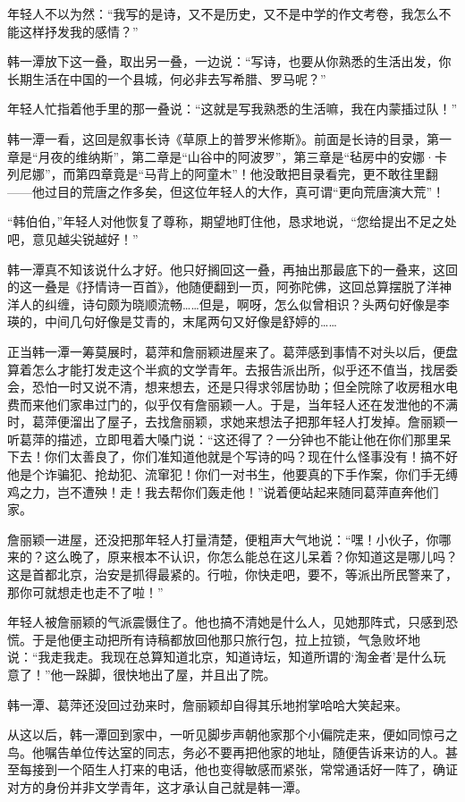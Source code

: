 \par 年轻人不以为然：“我写的是诗，又不是历史，又不是中学的作文考卷，我怎么不能这样抒发我的感情？”
\par 韩一潭放下这一叠，取出另一叠，一边说：“写诗，也要从你熟悉的生活出发，你长期生活在中国的一个县城，何必非去写希腊、罗马呢？”
\par 年轻人忙指着他手里的那一叠说：“这就是写我熟悉的生活嘛，我在内蒙插过队！”
\par 韩一潭一看，这回是叙事长诗《草原上的普罗米修斯》。前面是长诗的目录，第一章是“月夜的维纳斯”，第二章是“山谷中的阿波罗”，第三章是“毡房中的安娜·卡列尼娜”，而第四章竟是“马背上的阿童木”！他没敢把目录看完，更不敢往里翻——他过目的荒唐之作多矣，但这位年轻人的大作，真可谓“更向荒唐演大荒”！
\par “韩伯伯，”年轻人对他恢复了尊称，期望地盯住他，恳求地说，“您给提出不足之处吧，意见越尖锐越好！”
\par 韩一潭真不知该说什么才好。他只好搁回这一叠，再抽出那最底下的一叠来，这回的这一叠是《抒情诗一百首》，他随便翻到一页，阿弥陀佛，这回总算摆脱了洋神洋人的纠缠，诗句颇为晓顺流畅……但是，啊呀，怎么似曾相识？头两句好像是李瑛的，中间几句好像是艾青的，末尾两句又好像是舒婷的……
\par 正当韩一潭一筹莫展时，葛萍和詹丽颖进屋来了。葛萍感到事情不对头以后，便盘算着怎么才能打发走这个半疯的文学青年。去报告派出所，似乎还不值当，找居委会，恐怕一时又说不清，想来想去，还是只得求邻居协助；但全院除了收房租水电费而来他们家串过门的，似乎仅有詹丽颖一人。于是，当年轻人还在发泄他的不满时，葛萍便溜出了屋子，去找詹丽颖，求她来想法子把那年轻人打发掉。詹丽颖一听葛萍的描述，立即甩着大嗓门说：“这还得了？一分钟也不能让他在你们那里呆下去！你们太善良了，你们准知道他就是个写诗的吗？现在什么怪事没有！搞不好他是个诈骗犯、抢劫犯、流窜犯！你们一对书生，他要真的下手作案，你们手无缚鸡之力，岂不遭殃！走！我去帮你们轰走他！”说着便站起来随同葛萍直奔他们家。
\par 詹丽颖一进屋，还没把那年轻人打量清楚，便粗声大气地说：“嘿！小伙子，你哪来的？这么晚了，原来根本不认识，你怎么能总在这儿呆着？你知道这是哪儿吗？这是首都北京，治安是抓得最紧的。行啦，你快走吧，要不，等派出所民警来了，那你可就想走也走不了啦！”
\par 年轻人被詹丽颖的气派震慑住了。他也搞不清她是什么人，见她那阵式，只感到恐慌。于是他便主动把所有诗稿都放回他那只旅行包，拉上拉锁，气急败坏地说：“我走我走。我现在总算知道北京，知道诗坛，知道所谓的‘淘金者’是什么玩意了！”他一跺脚，很快地出了屋，并且出了院。
\par 韩一潭、葛萍还没回过劲来时，詹丽颖却自得其乐地拊掌哈哈大笑起来。
\par 从这以后，韩一潭回到家中，一听见脚步声朝他家那个小偏院走来，便如同惊弓之鸟。他嘱告单位传达室的同志，务必不要再把他家的地址，随便告诉来访的人。甚至每接到一个陌生人打来的电话，他也变得敏感而紧张，常常通话好一阵了，确证对方的身份并非文学青年，这才承认自己就是韩一潭。

